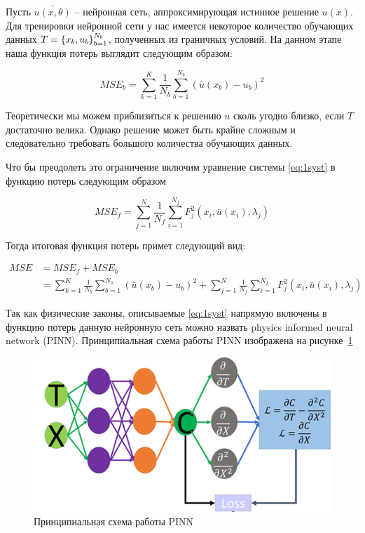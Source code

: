 \documentclass[a4paper,14pt]{extarticle} %
\begin{document}
Пусть $\bar{u(x, \theta)}$ -- нейронная сеть, аппроксимирующая истинное решение $u(x)$. Для тренировки нейронной сети у нас имеется некоторое количество обучающих данных $T={\left\{ x_b, u_b \right\}}_{b=1}^{N_b}$, полученных из граничных условий. На данном этапе наша функция потерь выглядит следующим образом:

\begin{equation}
    MSE_b = \sum_{k=1}^{K}\frac{1}{N_b}\sum_{b=1}^{N_b} (\bar{u}(x_b) - u_b)^2
\end{equation}

Теоретически мы можем приблизиться к решению $u$ сколь угодно близко, если $T$ достаточно велика. Однако решение может быть крайне сложным и следовательно требовать большого количества обучающих данных.

Что бы преодолеть это ограничение включим уравнение системы \ref{eq:1syst} в функцию потерь следующим образом

\begin{equation}
    MSE_f = \sum_{j=1}^N\frac{1}{N_f}\sum_{i=1}^{N_f} F_j^2(x_i, \bar{u}(x_i), \lambda_j)
\end{equation}

Тогда итоговая функция потерь примет следующий вид:

\begin{equation} \label{eq:loss}
    \begin{aligned}
        MSE &= MSE_f + MSE_b \\
        &=  \sum_{k=1}^{K}\frac{1}{N_b}\sum_{b=1}^{N_b} (\bar{u}(x_b) - u_b)^2 + \sum_{j=1}^N\frac{1}{N_f}\sum_{i=1}^{N_f} F_j^2(x_i, \bar{u}(x_i), \lambda_j)
    \end{aligned}
\end{equation}


Так как физические законы, описываемые \eqref{eq:1syst} напрямую включены в функцию потерь данную нейронную сеть можно назвать physics informed neural network (PINN). Принципиальная схема работы PINN изображена на рисунке~\ref{fig:pinn_scheme}

\begin{figure}[ht]
    \center
    \includegraphics{PINN scheme.png}
    \caption{Принципиальная схема работы PINN}
    \label{fig:pinn_scheme}
\end{figure}
\end{document}
